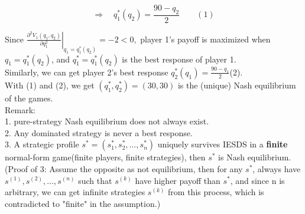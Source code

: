 \documentclass[twoside]{article}
\theoremstyle{definitionstyle}
\begin{document}
\[
\Rightarrow\quad q_1^*(q_2) = \frac{90 - q_2}{2} \qquad (1)
\]

Since 
$
\left.\frac{\partial^2 V_1(q_1, q_2)}{\partial q_1^2}\right|_{q_1 = q_1^*(q_2)} = -2 < 0,
$
player 1's payoff is maximized when \( q_1 = q_1^*(q_2) \), and \( q_1^* = q_1^*(q_2) \) is the best response of player 1.\\
Similarly, we can get player 2's best response $q_2^*(q_1) = \frac{90 - q_1}{2}$\quad (2).\\
With (1) and (2), we get $(q_1^*,q_2^*) = (30,30)$ is the (unique) Nash equilibrium of the 
games. \\
Remark:\\
1. pure-strategy Nash equilibrium does not always exist.\\
2. Any dominated strategy is never a best response.\\
3. A strategic profile $s^*=(s_1^*,s_2^*,\dots,s_n^*)$ uniquely survives IESDS in a \textbf{finite} normal-form game(finite players, finite strategies), then $s^*$ is Nash equilibrium.\\
(Proof of 3: 
Assume the opposite as not equilibrium, then for any $s^*$, always have $s^{(1)}, s^{(2)}, \dots,s^{(n)}$ such that $s^{(k)}$ have higher payoff than $s^*$, and since n is arbitrary, we can get infinite strategies $s^{(k)}$ from this process, which is contradicted to "finite" in the assumption.)
%
%
%
%
%
\end{document}
